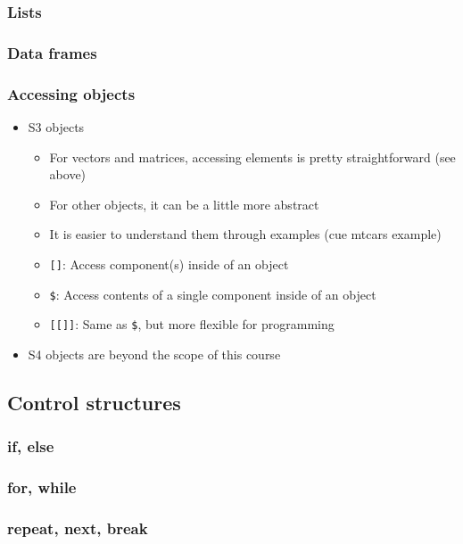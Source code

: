 \documentclass{beamer}
\begin{document}
\begin{frame}[fragile]
    \frametitle{Lists}
    \fontsize{11pt}{10}\selectfont
    
\end{frame}


\begin{frame}[fragile]
    \frametitle{Data frames}
    
\end{frame}


\begin{frame}[fragile]
    \frametitle{Accessing objects}
	\begin{itemize}
	  \item S3 objects
	    \begin{itemize}
	      \item For vectors and matrices, accessing elements is pretty straightforward (see above)
	      \item For other objects, it can be a little more abstract
	      \item It is easier to understand them through examples (cue mtcars example)
	      \item \texttt{[]}: Access component(s) inside of an object
	      \item \texttt{\$}: Access contents of a single component inside of an object
	      \item \texttt{[[]]}: Same as \texttt{\$}, but more flexible for programming
	    \end{itemize}
	  \item S4 objects are beyond the scope of this course
	\end{itemize}
\end{frame}


\subsection{Control structures}

\begin{frame}[fragile]
    \frametitle{if, else}
    
\end{frame}


\begin{frame}[fragile]
    \frametitle{for, while}
    
\end{frame}


\begin{frame}[fragile]
    \frametitle{repeat, next, break}
    
\end{frame}
\end{document}
